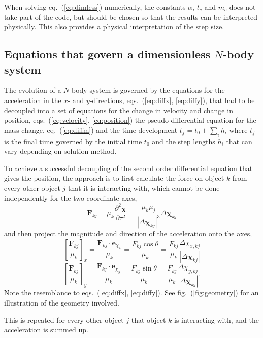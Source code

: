 \documentclass[a4paper,11pt]{article}
\begin{document}
When solving eq.~(\ref{eq:dimless}) numerically, the constants $\alpha$, $t_c$ and $m_c$ does not take part of the code, but should be chosen so that the results can be interpreted physically. This also provides a physical interpretation of the step size.

\subsection{Equations that govern a dimensionless $N$-body system}
The evolution of a $N$-body system is governed by the equations for the acceleration in the $x$- and $y$-directions, eqs.~(\ref{eq:diffx}, \ref{eq:diffy}), that had to be decoupled into a set of equations for the change in velocity and change in position, eqs.~(\ref{eq:velocity}, \ref{eq:position}) the pseudo-differential equation for the mass change, eq.~(\ref{eq:diffm}) and the time development $t_f = t_0 + \sum_i h_i$ where $t_f$ is the final time governed by the initial time $t_0$ and the step lengths $h_i$ that can vary depending on solution method.

To achieve a successful decoupling of the second order differential equation that gives the position, the approach is to first calculate the force on object $k$ from every other object $j$ that it is interacting with, which cannot be done independently for the two coordinate axes, 
\[ \mathbf{F}_{kj} = \mu_k \frac{\partial^2 \boldsymbol{\chi}}{\partial \tau^2} = \frac{\mu_k \mu_j}{|\Delta \boldsymbol{\chi}_{kj}|^3} \Delta \boldsymbol{\chi}_{kj} \]
and then project the magnitude and direction of the acceleration onto the axes,
\[ \left[ \frac{\mathbf{F}_{kj}}{\mu_k} \right]_x = \frac{\mathbf{F}_{kj} \cdot \mathbf{e}_{\chi_x}}{\mu_k} = \frac{F_{kj} \cos \theta}{\mu_k} = \frac{F_{kj}}{\mu_k} \frac{\Delta \chi_{x,kj}}{|\Delta \boldsymbol{\chi}_{kj}|}  \]
\[ \left[ \frac{\mathbf{F}_{kj}}{\mu_k} \right]_y =  \frac{\mathbf{F}_{kj} \cdot \mathbf{e}_{\chi_y}}{\mu_k} = \frac{F_{kj} \sin \theta}{\mu_k} = \frac{F_{kj}}{\mu_k} \frac{\Delta \chi_{y,kj}}{|\Delta \boldsymbol{\chi}_{kj}|}.  \]
Note the resemblance to eqs.~(\ref{eq:diffx}, \ref{eq:diffy}). See fig.~(\ref{fig:geometry}) for an illustration of the geometry involved.

This is repeated for every other object $j$ that object $k$ is interacting with, and the acceleration is summed up.
\end{document}
